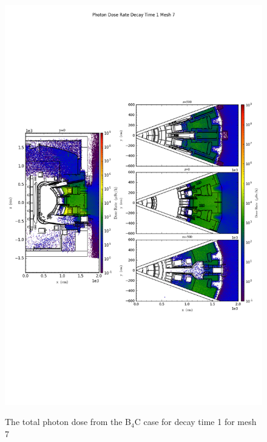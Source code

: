 \begin{figure}[ht!]
\centering
\includegraphics[trim={0cm 9cm 0cm 10cm},clip,scale=0.75]{../plots/final_model_with_b4c/Photon_Dose_Rate_Decay_Time_1_Mesh_7.png}
\label{fig:photons_dc1_no4bc_m7_flux}
\caption{The total photon dose from the B$_4$C case for decay time 1 for mesh 7}
\end{figure}
